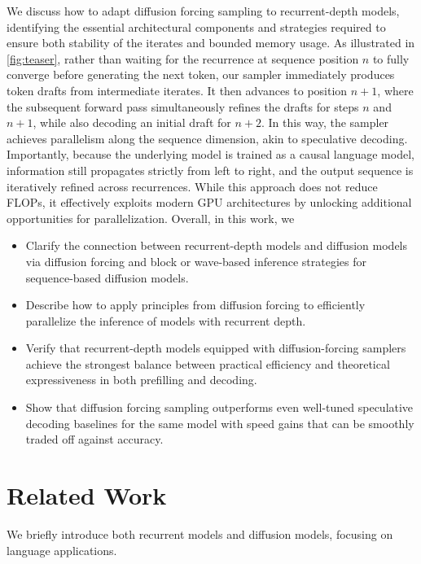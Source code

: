 \documentclass{article} %
\theoremstyle{definition}
\theoremstyle{plain}
\begin{document}
We discuss how to adapt diffusion forcing sampling to recurrent-depth models, identifying the essential architectural components and strategies required to ensure both stability of the iterates and bounded memory usage. As illustrated in \cref{fig:teaser}, rather than waiting for the recurrence at sequence position $n$ to fully converge before generating the next token, our sampler immediately produces token drafts from intermediate iterates. It then advances to position $n+1$, where the subsequent forward pass simultaneously refines the drafts for steps $n$ and $n+1$, while also decoding an initial draft for $n+2$. In this way, the sampler achieves parallelism along the sequence dimension, akin to speculative decoding. Importantly, because the underlying model is trained as a causal language model, information still propagates strictly from left to right, and the output sequence is iteratively refined across recurrences. While this approach does not reduce FLOPs, it effectively exploits modern GPU architectures by unlocking additional opportunities for parallelization. Overall, in this work, we 
\begin{itemize}[itemsep=0.0pt,topsep=0pt,leftmargin=*]
    \item Clarify the connection between recurrent-depth models and diffusion models via diffusion forcing and block or wave-based inference strategies for sequence-based diffusion models.
    \item Describe how to apply principles from diffusion forcing to efficiently parallelize the inference of models with recurrent depth.%
    \item Verify that recurrent-depth models equipped with diffusion-forcing samplers achieve the strongest balance between practical efficiency and theoretical expressiveness in both prefilling and decoding. 
    \item {} Show that diffusion forcing sampling outperforms even well-tuned speculative decoding baselines for the same model with speed gains that can be smoothly traded off against accuracy.
\end{itemize}
\vspace{-.1cm}
\section{Related Work}

We briefly introduce both recurrent models and diffusion models, focusing on language applications. 
\end{document}
